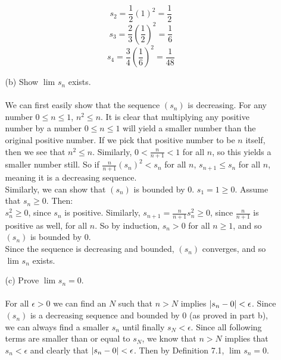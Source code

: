 \begin{itemize}
\begin{itemize}
        $$s_2 = \frac{1}{2}(1)^2 = \frac{1}{2}$$
        $$s_3 = \frac{2}{3}(\frac{1}{2})^2 = \frac{1}{6}$$
        $$s_4 = \frac{3}{4}(\frac{1}{6})^2 = \frac{1}{48}$$
      \item [(b)] Show $\lim_{} s_n$ exists.\\\\

        We can first easily show that the sequence $(s_n)$ is decreasing. For any number $0 \leq n \leq 1$, $n^2 \leq n$. It is clear that multiplying any positive number by a number $0 \leq n \leq 1$ will yield a smaller number than the original positive number. If we pick that positive number to be $n$ itself, then we see that $n^2 \leq n$. Similarly, $0 < \frac{n}{n+1} < 1$ for all $n$, so this yields a smaller number still. So if $\frac{n}{n+1}(s_n)^2 < s_n$ for all $n$, $s_{n+1} \leq s_n$ for all $n$, meaning it is a decreasing sequence.\\

        Similarly, we can show that $(s_n)$ is bounded by 0. $s_1 = 1 \geq 0$. Assume that $s_n \geq 0$. Then:\\
        $s_n^2 \geq 0$, since $s_n$ is positive. Similarly, $s_{n+1} = \frac{n}{n+1} s_n^2 \geq 0$, since $\frac{n}{n+1}$ is positive as well, for all $n$. So by induction, $s_n > 0$ for all $n \geq 1$, and so $(s_n)$ is bounded by 0.\\

        Since the sequence is decreasing and bounded, $(s_n)$ converges, and so $\lim_{} s_n$ exists.\\
        
      \item [(c)] Prove $\lim_{} s_n = 0$.\\\\

        For all $\epsilon > 0$ we can find an $N$ such that $n > N$ implies $\left\vert s_n - 0 \right\vert < \epsilon$. Since $(s_n)$ is a decreasing sequence and bounded by 0 (as proved in part b), we can always find a smaller $s_n$ until finally $s_N < \epsilon$. Since all following terms are smaller than or equal to $s_N$, we know that $n > N$ implies that $s_n < \epsilon$ and clearly that $\left\vert s_n - 0 \right\vert < \epsilon$. Then by Definition 7.1, $\lim_{} s_n = 0$.
    \end{itemize}
\end{itemize}


